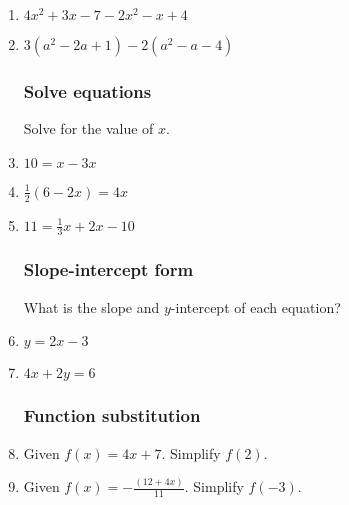 \documentclass[12pt, oneside]{article}
\begin{document}
\begin{enumerate}
  \begin{center} %
  \end{center}


\newpage
  \item $4x^2+3x -7 -2x^2-x+4$ \vspace{3cm}
  \item $3(a^2-2a +1) -2(a^2-a-4)$ \vspace{3cm}

\subsubsection*{Solve equations}

Solve for the value of $x$.
\item   $10=x-3x$ \vspace{3cm}
\item   $\frac{1}{2}(6-2x)=4x$ \vspace{3cm}
\item   $11=\frac{1}{3}x+2x-10$ \vspace{3cm}


\subsubsection*{Slope-intercept form}

What is the slope and $y$-intercept of each equation?
\item   $y=2x-3$ \vspace{2cm}
\item   $4x+2y=6$ \vspace{3cm}


\subsubsection*{Function substitution}
\item Given $f(x)=4x+7$. Simplify $f(2)$. \vspace{4cm}
\item Given $\displaystyle f(x)=-\frac{(12+4x)}{11}$. Simplify $f(-3)$.

\newpage


\end{enumerate}
\end{document}
